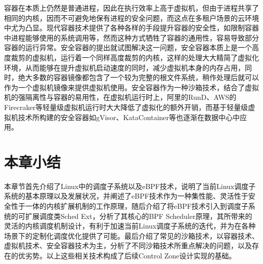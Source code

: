 容器在本质上仍然是普通进程，因此在执行效率上高于虚拟机，但由于进程共享了相同的内核，因而不可避免地保有进程的安全问题，而这点在多租户场景的云环境中尤为凸显。现代容器技术提供了各种各样的手段提升容器的安全性，如限制容器中进程能够使用的系统调用等，然而这种方式牺牲了容器的通用性，容易导致部分容器的运行异常。安全容器的提出就试图解决这一问题，安全容器本质上是一个高度裁剪的虚拟机，运行着一个同样高度裁剪的内核，这样的处理大大精简了虚拟化环境，从而能够在提升虚拟机启动速度的同时，减少虚拟机本身的内存占用，同时，绝大多数的容器镜像都包含了一个较为完整的根文件系统，稍作处理后就可以作为一个虚拟机镜像来提供虚拟机使用。安全容器作为一种沙箱技术，结合了虚拟机的强隔离性与容器的易用性，在虚拟机运行时上，阿里的RunD\citep{li2022rund}、AWS的Firecraker\citep{agache2020firecracker}等轻量级虚拟机运行时大大降低了虚拟化的额外开销，而基于轻量级虚拟机技术所构建的安全容器如gVisor、KataContainer\citep{randazzo2019kata}等也逐渐在数据中心中应用。

\section{本章小结}

本章节首先介绍了Linux中的调度子系统以及eBPF技术，说明了当前Linux调度子系统的基本原理以及发展状况，并阐述了eBPF技术作为一种集性能、灵活性于安全性于一体的内核扩展机制的工作原理，随后介绍了将eBPF技术引入到调度子系统的可扩展调度类Sched Ext，分析了其核心的BPF Scheduler原理，其所带来的灵活的内核调度机制设计，有利于加速当前Linux调度子系统的迭代，并为在各种场景下的定制化调度优化提供了可能。最后介绍了常见的沙箱技术，以容器技术、虚拟机技术、安全容器技术为主，分析了不同沙箱技术所重点解决的问题，以及存在的优劣势。以上这些相关技术构成了后续Control Zone设计实现的基础。